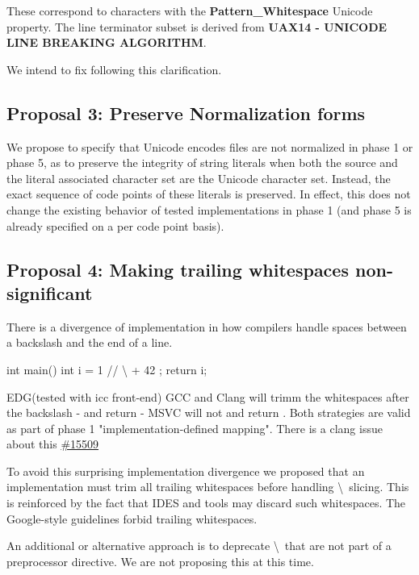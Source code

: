 \documentclass{wg21}
\begin{document}
These correspond to characters with the \textbf{Pattern_Whitespace} Unicode property.
The line terminator subset is derived from \textbf{UAX14 - UNICODE LINE BREAKING ALGORITHM}.

We intend to fix  following this clarification.

\subsection{Proposal 3: Preserve Normalization forms}

We propose to specify that Unicode encodes files are not normalized in phase 1 or phase 5, as to preserve the integrity 
of string literals when both the source and the literal associated character set are the Unicode character set.
Instead, the exact sequence of code points of these literals is preserved.
In effect, this does not change the existing behavior of tested implementations in phase 1 (and phase 5 is already specified on a per code point basis).

\pagebreak

\subsection{Proposal 4: Making trailing whitespaces non-significant}

There is a divergence of implementation in how compilers handle spaces between a backslash and the end of a line. 

\begin{colorblock}
int main() {
    int i = 1
    //  \textbackslash  
    + 42
    ;
    return i;
}
\end{colorblock}

EDG(tested with icc front-end) GCC and Clang will trimm the whitespaces after the backslash - and return  - MSVC will not and return .
Both strategies are valid as part of phase 1 "implementation-defined mapping".
There is a clang issue about this \href{https://bugs.llvm.org/show_bug.cgi?id=15509}{\#15509}

To avoid this surprising implementation divergence we proposed that an implementation must trim all trailing whitespaces before handling \textbackslash \ slicing.
This is reinforced by the fact that IDES and tools may discard such whitespaces. The Google-style guidelines forbid trailing whitespaces.

An additional or alternative approach is to deprecate \textbackslash \ that are not part of a preprocessor directive.
We are not proposing this at this time.
\end{document}
